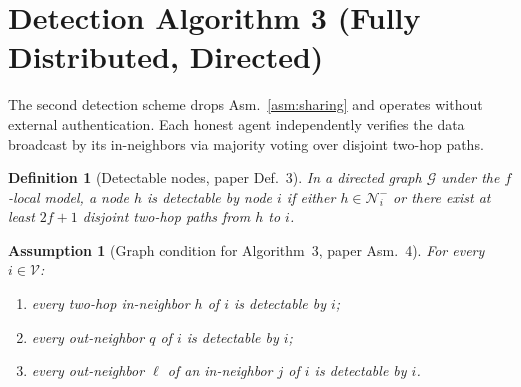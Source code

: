 \documentclass[journal]{IEEEtran}
\newtheorem{definition}{Definition}
\newtheorem{assumption}{Assumption}
\newcommand{\NN}{\mathcal{N}}
\newcommand{\GG}{\mathcal{G}}
\newcommand{\VV}{\mathcal{V}}
\begin{document}
\section{Detection Algorithm 3 (Fully Distributed, Directed)}
\label{sec:alg3}

The second detection scheme drops Asm.~\ref{asm:sharing} and operates without
external authentication.  Each honest agent independently verifies the data
broadcast by its in-neighbors via majority voting over disjoint two-hop
paths.

\begin{definition}[Detectable nodes, paper Def.~3]
\label{def:detectable}
In a directed graph $\GG$ under the $f$-local model, a node $h$ is
\emph{detectable} by node $i$ if either $h\in\NN_i^-$ or there exist at least
$2f+1$ disjoint two-hop paths from $h$ to $i$.
\end{definition}

\begin{assumption}[Graph condition for Algorithm~3, paper Asm.~4]
\label{asm:alg3}
For every $i\in\VV$:
\begin{enumerate}
\item every two-hop in-neighbor $h$ of $i$ is detectable by $i$;
\item every out-neighbor $q$ of $i$ is detectable by $i$;
\item every out-neighbor $\ell$ of an in-neighbor $j$ of $i$ is detectable
by $i$.
\end{enumerate}
\end{assumption}
\end{document}
